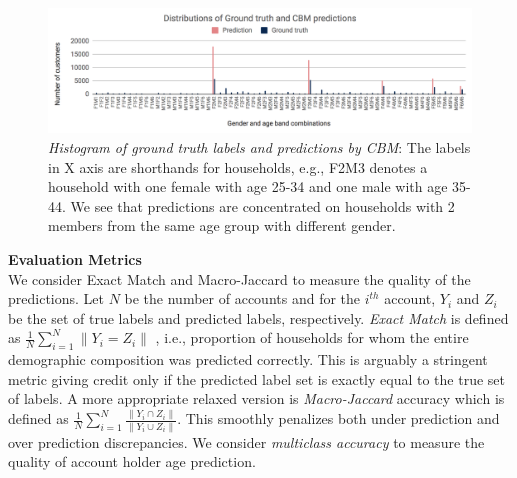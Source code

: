 \begin{figure}
  \captionsetup{font=small}
  \setlength{\belowcaptionskip}{-10pt}
  \centering
  \includegraphics[width=.99\linewidth]{cbmPredictions3.png}
  \caption{ \textit{Histogram of ground truth labels and predictions by CBM}: The labels in X axis are shorthands for households, e.g., F2M3 denotes a household with one female with age 25-34 and one male with age 35-44. 
  We see that predictions are concentrated on households with 2 members from the same age group with different gender.}
  \label{fig:histogram-cbm}
\end{figure}
%
%
%
%
%
%
\textbf{Evaluation Metrics}\\
We consider Exact Match and Macro-Jaccard to measure the quality of the predictions. Let $N$ be the number of accounts and for the $i^{th}$ account,  $Y_i$ and $Z_i$ be the set of true labels and predicted labels, respectively. 
\textit{Exact Match} is defined as  $\frac{1}{N} \sum_{i=1}^N \|Y_i = Z_i \|$ , i.e., proportion of households for whom the entire demographic composition was predicted correctly.  This is arguably a stringent metric giving credit only if the predicted label set is exactly equal to the true set of labels. A more appropriate relaxed version is \textit{Macro-Jaccard} accuracy which is defined as $\frac{1}{N}\sum_{i=1}^N \frac{\|Y_i \cap Z_i \|}{\|Y_i \cup Z_i \|}$. This smoothly penalizes both under prediction and over prediction discrepancies. 
We consider \textit{multiclass accuracy} to measure the quality of account holder age prediction.
%
%
